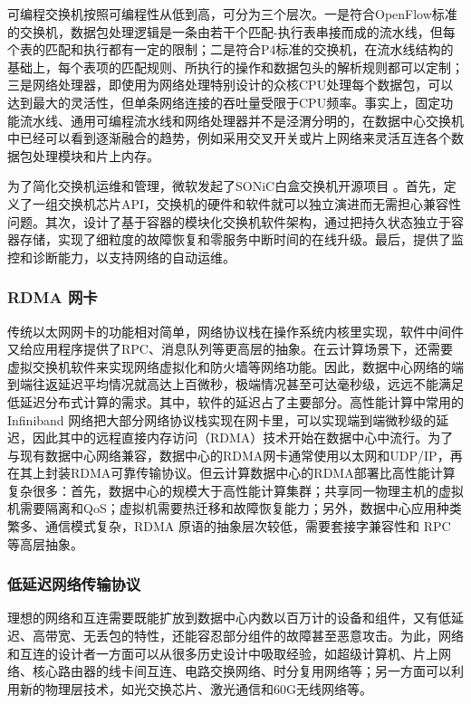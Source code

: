 可编程交换机按照可编程性从低到高，可分为三个层次。一是符合OpenFlow标准的交换机，数据包处理逻辑是一条由若干个匹配-执行表串接而成的流水线，但每个表的匹配和执行都有一定的限制；二是符合P4标准的交换机，在流水线结构的基础上，每个表项的匹配规则、所执行的操作和数据包头的解析规则都可以定制；三是网络处理器，即使用为网络处理特别设计的众核CPU处理每个数据包，可以达到最大的灵活性，但单条网络连接的吞吐量受限于CPU频率。事实上，固定功能流水线、通用可编程流水线和网络处理器并不是泾渭分明的，在数据中心交换机中已经可以看到逐渐融合的趋势，例如采用交叉开关或片上网络来灵活互连各个数据包处理模块和片上内存。

为了简化交换机运维和管理，微软发起了SONiC白盒交换机开源项目 \cite{sonic}。首先，定义了一组交换机芯片API，交换机的硬件和软件就可以独立演进而无需担心兼容性问题。其次，设计了基于容器的模块化交换机软件架构，通过把持久状态独立于容器存储，实现了细粒度的故障恢复和零服务中断时间的在线升级。最后，提供了监控和诊断能力，以支持网络的自动运维。

\subsubsection{RDMA 网卡}

传统以太网网卡的功能相对简单，网络协议栈在操作系统内核里实现，软件中间件又给应用程序提供了RPC、消息队列等更高层的抽象。在云计算场景下，还需要虚拟交换机软件来实现网络虚拟化和防火墙等网络功能。因此，数据中心网络的端到端往返延迟平均情况就高达上百微秒，极端情况甚至可达毫秒级，远远不能满足低延迟分布式计算的需求。其中，软件的延迟占了主要部分。高性能计算中常用的 Infiniband \cite{infiniband2000infiniband} 网络把大部分网络协议栈实现在网卡里，可以实现端到端微秒级的延迟，因此其中的远程直接内存访问（RDMA）技术开始在数据中心中流行。为了与现有数据中心网络兼容，数据中心的RDMA网卡通常使用以太网和UDP/IP，再在其上封装RDMA可靠传输协议。但云计算数据中心的RDMA部署比高性能计算复杂很多：首先，数据中心的规模大于高性能计算集群；共享同一物理主机的虚拟机需要隔离和QoS；虚拟机需要热迁移和故障恢复能力；另外，数据中心应用种类繁多、通信模式复杂，RDMA 原语的抽象层次较低，需要套接字兼容性和 RPC 等高层抽象。

\subsubsection{低延迟网络传输协议}

理想的网络和互连需要既能扩放到数据中心内数以百万计的设备和组件，又有低延迟、高带宽、无丢包的特性，还能容忍部分组件的故障甚至恶意攻击。为此，网络和互连的设计者一方面可以从很多历史设计中吸取经验，如超级计算机、片上网络、核心路由器的线卡间互连、电路交换网络、时分复用网络等；另一方面可以利用新的物理层技术，如光交换芯片、激光通信和60G无线网络等。

